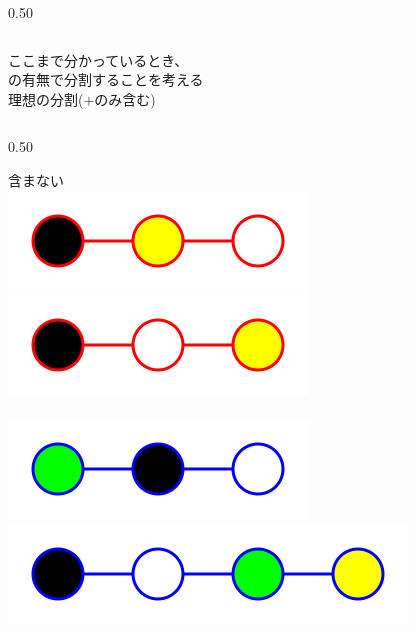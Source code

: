 \begin{tcolorbox}[title={\Large Gradient~Boosting~Decition~Tree}]
\begin{columns}[t]
\begin{column}{0.50\hsize}
\begin{tcolorbox}[colback=white]
			\end{tcolorbox}
		\end{column}
	\end{columns}

	\vspace{60px}
	ここまで分かっているとき、 \\
	の有無で分割することを考える \\

	理想の分割($\plus$のみ含む) \\
	\vspace{-60px}
	\begin{columns}[t]
		\begin{column}{0.50\hsize}
		\begin{tcolorbox}[colback=white]
			含まない \\
			\includegraphics[height=0.7\baselineskip]{img/graph/g02r.png} \hspace{30px}
			\includegraphics[height=0.7\baselineskip]{img/graph/g03r.png} \\
			\vspace{10px} \\
			\includegraphics[height=0.7\baselineskip]{img/graph/g04b.png} \hspace{10px}
			\includegraphics[height=0.7\baselineskip]{img/graph/g08b.png} \hspace{10px}

\end{tcolorbox}
\end{column}
\end{columns}
\end{tcolorbox}
